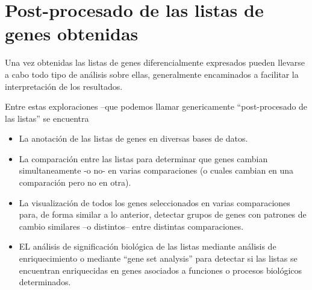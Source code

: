 \documentclass[a4paper]{article}\usepackage[]{graphicx}\usepackage[]{color}
\makeatletter
\newenvironment{kframe}{%
 \def\at@end@of@kframe{}%
 \ifinner\ifhmode%
  \def\at@end@of@kframe{\end{minipage}}%
  \begin{minipage}{\columnwidth}%
 \fi\fi%
 \def\FrameCommand##1{\hskip\@totalleftmargin \hskip-\fboxsep
 \colorbox{shadecolor}{##1}\hskip-\fboxsep
     \hskip-\linewidth \hskip-\@totalleftmargin \hskip\columnwidth}%
 \MakeFramed {\advance\hsize-\width
   \@totalleftmargin\z@ \linewidth\hsize
   \@setminipage}}%
 {\par\unskip\endMakeFramed%
 \at@end@of@kframe}
\makeatother
\begin{document}
\begin{kframe}


{\ttfamily\noindent\bfseries\color{errorcolor}{\#\# Error in `[.data.frame`(topTab\_AvsL, 1:10, 1:7): undefined columns selected}}

{\ttfamily\noindent\bfseries{}}\end{kframe}

\begin{kframe}


{\ttfamily\noindent\bfseries\color{errorcolor}{\#\# Error in `[.data.frame`(topTab\_BvsL, 1:10, 1:7): undefined columns selected}}

{\ttfamily\noindent\bfseries{}}\end{kframe}


\section{Post-procesado de las listas de genes obtenidas}

Una vez obtenidas las listas de genes diferencialmente expresados pueden llevarse a cabo todo tipo de análisis sobre ellas, generalmente encaminados a facilitar la interpretación de los resultados.

Entre estas exploraciones --que podemos llamar genericamente ``post-procesado de las listas'' se encuentra

\begin{itemize}
\item La anotación de las listas de genes en diversas bases de datos.

\item La comparación entre las listas para determinar que genes cambian simultaneamente -o no- en varias comparaciones (o cuales cambian en una comparación pero no en otra).
\item La visualización de todos los genes seleccionados en varias comparaciones para, de forma similar a lo anterior, detectar grupos de genes con patrones de cambio similares --o distintos-- entre distintas comparaciones.
\item EL análisis de significación biológica de las listas mediante análisis de enriquecimiento o mediante ``gene set analysis'' para detectar si las listas se encuentran enriquecidas en genes asociados a funciones o procesos biológicos determinados.
\end{itemize}
\end{document}
